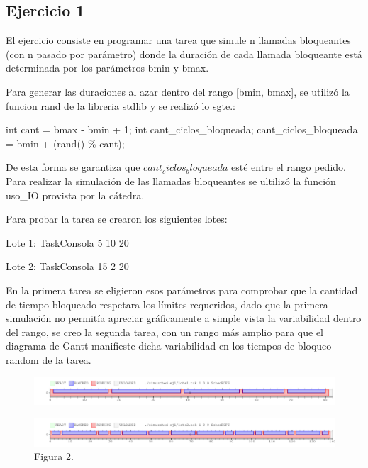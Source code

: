 \subsection{Ejercicio 1}
El ejercicio consiste en programar una tarea que simule n llamadas bloqueantes (con n pasado por parámetro) donde la duración de cada llamada bloqueante está determinada por los parámetros bmin y bmax.

Para generar las duraciones al azar dentro del rango [bmin, bmax], se utilizó la funcion rand de la libreria stdlib y se realizó lo sgte.:

	int cant = bmax - bmin + 1; 
	int cant_ciclos_bloqueada;
	cant_ciclos_bloqueada = bmin + (rand() \% cant);

De esta forma se garantiza que $cant_ciclos_bloqueada$ esté entre el rango pedido.
Para realizar la simulación de las llamadas bloqueantes se ultilizó la función uso_IO provista por la cátedra.

Para probar la tarea se crearon los siguientes lotes:

Lote 1:
TaskConsola 5 10 20 

Lote 2:
TaskConsola 15 2 20 

En la primera tarea se eligieron esos parámetros para comprobar que la cantidad de tiempo bloqueado respetara los límites requeridos, dado que la primera simulación no permitía apreciar gráficamente a simple vista la variabilidad dentro del rango, se creo la segunda tarea, con un rango más amplio para que el diagrama de Gantt manifieste dicha variabilidad en los tiempos de bloqueo random de la tarea.

\begin{figure}[h]
  \includegraphics[width=\textwidth]{../ej1/lote1.png}
  \caption{}
\end{figure}

\begin{figure}[h]
  \includegraphics[width=\textwidth]{../ej1/lote2.png}
  \caption{Figura 2.}
\end{figure}